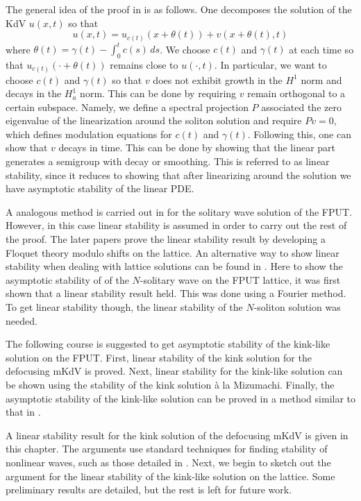 The general idea of the proof in \cite{pego1994asymptotic} is as follows. One decomposes the solution of the KdV \(u(x,t)\) so that
\begin{equation}
	u(x,t)  = u_{c(t)} (x + \theta(t)) + v(x + \theta(t), t)
\end{equation}
where \(\theta(t) = \gamma(t) - \int_0^t c(s)\, ds\). We choose \(c(t)\) and \(\gamma(t)\) at each time so that \(u_{c(t)} (\cdot + \theta(t))\) remains close to \(u(\cdot, t)\). In particular, we want to choose \(c(t)\) and \(\gamma(t)\) so that \(v\) does not exhibit growth in the \(H^1\) norm and decays in the \(H^1_a\) norm. This can be done by requiring \(v\) remain orthogonal to a certain subspace. Namely, we define a spectral projection \(P\) associated the zero eigenvalue of the linearization around the soliton solution and require \(P v = 0\), which defines modulation equations for \(c(t)\) and \(\gamma(t)\). Following this, one can show that \(v\) decays in time. This can be done by showing that the linear part generates a semigroup with decay or smoothing. This is referred to as linear stability, since it reduces to showing that after linearizing around the solution we have asymptotic stability of the linear PDE.

A analogous method is carried out in \cite{friesecke2002solitary} for the solitary wave solution of the FPUT. However, in this case linear stability is assumed in order to carry out the rest of the proof. The later papers \cite{friesecke2003solitary,friesecke2004solitary} prove the linear stability result by developing a Floquet theory modulo shifts on the lattice. An alternative way to show linear stability when dealing with lattice solutions can be found in \cite{mizumachi2013asymptotic}. Here to show the asymptotic stability of of the \(N\)-solitary wave on the FPUT lattice, it was first shown that a linear stability result held. This was done using a Fourier method. To get linear stability though, the linear stability of the \(N\)-soliton solution was needed.

The following course is suggested to get asymptotic stability of the kink-like solution on the FPUT. First, linear stability of the kink solution for the defocusing mKdV is proved. Next, linear stability for the kink-like solution can be shown using the stability of the kink solution \`a la Mizumachi. Finally, the asymptotic stability of the kink-like solution can be proved in a method similar to that in \cite{friesecke2002solitary}.

A linear stability result for the kink solution of the defocusing mKdV is given in this chapter. The arguments use standard techniques for finding stability of nonlinear waves, such as those detailed in \cite{kapitula2013spectral}. Next, we begin to sketch out the argument for the linear stability of the kink-like solution on the lattice. Some preliminary results are detailed, but the rest  is left for future work.
